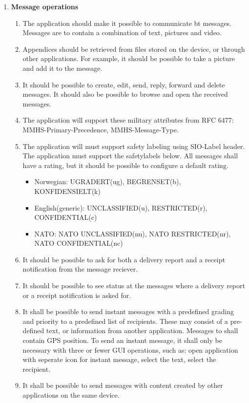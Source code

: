 \begin{enumerate}
\begin{enumerate}
\end{enumerate}
\item{}\textbf{Message operations}
\begin{enumerate}
\item{}The application should make it possible to communicate bt messages. Messages are to contain a combination of text, pictures and video.
\item{}Appendices should be retrieved from files stored on the device, or through other applications. For example, it should be possible to take a picture and add it to the message.
\item{}It should be possible to create, edit, send, reply, forward and delete messages. It should also be possible to browse and open the received messages.
\item{}The application will support these military attributes from RFC 6477: MMHS-Primary-Precedence, MMHS-Message-Type.
\item{}The application will must support safety labeling using SIO-Label header. The application must support the safetylabels below. All messages shall have a rating, but it should be possible to configure a default rating.
\begin{itemize}
\item{}Norwegian: UGRADERT(ug), BEGRENSET(b), KONFIDENSIELT(k)
\item{}English(generic): UNCLASSIFIED(u), RESTRICTED(r), CONFIDENTIAL(c)
\item{}NATO: NATO UNCLASSIFIED(nu), NATO RESTRICTED(nr), NATO CONFIDENTIAL(nc)
\end{itemize}
\item{}It should be possible to ask for both a delivery report and a receipt notification from the message reciever.
\item{}It should be possible to see status at the messages where a delivery report or a receipt notification is asked for.
\item{}It shall be possible to send instant messages with a predefined grading and priority to a predefined list of recipients. These may consist of a pre-defined text, or information from another application. Messages to shall contain GPS position. To send an instant message, it shall only be necessary with three or fewer GUI operations, such as: open application with seperate icon for instant message, select the text, select the recipient.
\item{}It shall be possible to send messages with content created by other applications on the same device.

\end{enumerate}
\end{enumerate}
